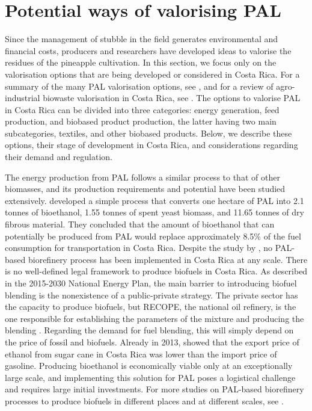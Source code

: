\section{Potential ways of valorising PAL}

Since the management of stubble in the field generates environmental and financial costs, producers and researchers have developed ideas to valorise the residues of the pineapple cultivation. In this section, we focus only on the valorisation options that are being developed or considered in Costa Rica. For a summary of the many PAL valorisation options, see \cite{aili2021recent}, and for a review of agro-industrial biowaste valorisation in Costa Rica, see \cite{eixenberger2022tropical}. The options to valorise PAL in Costa Rica can be divided into three categories: energy generation, feed production, and biobased product production, the latter having two main subcategories, textiles, and other biobased products. Below, we describe these options, their stage of development in Costa Rica, and considerations regarding their demand and regulation. 

The energy production from PAL follows a similar process to that of other biomasses, and its production requirements and potential have been studied extensively. \cite{chen2020production} developed a simple process that converts one hectare of PAL into 2.1 tonnes of bioethanol, 1.55 tonnes of spent yeast biomass, and 11.65 tonnes of dry fibrous material. They concluded that the amount of bioethanol that can potentially be produced from PAL would replace approximately 8.5\% of the  fuel consumption for transportation in Costa Rica. Despite the study by \citeauthor{chen2020production}, no PAL-based biorefinery process has been implemented in Costa Rica at any scale. There is no well-defined legal framework to produce biofuels in Costa Rica. As described in the 2015-2030 National Energy Plan, the main barrier to introducing biofuel blending is the nonexistence of a public-private strategy. The private sector has the capacity to produce biofuels, but RECOPE, the national oil refinery, is the one responsible for establishing the parameters of the mixture and producing the blending \citep{planClimaCR}. Regarding the demand for fuel blending, this will simply depend on the price of fossil and biofuels. Already in 2013, \cite{GarciaTEC} showed that the export price of ethanol from sugar cane in Costa Rica was lower than the import price of gasoline. Producing bioethanol is economically viable only at an exceptionally large scale, and implementing this solution for PAL poses a logistical challenge and requires large initial investments. For more studies on PAL-based biorefinery processes to produce biofuels in different places and at different scales, see \cite{murcia2022biorefinery, saini2022valorization, silva2020second, mund2021cellulose}.

